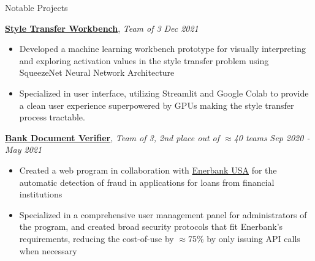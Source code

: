 \documentclass{resume}
\begin{document}
%
%
%
%
%
%
\begin{rSection}{Notable Projects}

    \href{https://github.com/jlucasa/style-transfer-vis}{{\bf Style Transfer Workbench}}, {\em Team of 3} {\em \hfill Dec 2021}
    \vspace{-6pt}
    \begin{itemize}[nosep]
        \item Developed a machine learning workbench prototype for visually interpreting and exploring activation values in the style transfer problem using SqueezeNet Neural Network Architecture
        \item Specialized in user interface, utilizing Streamlit and Google Colab to provide a clean user experience superpowered by GPUs making the style transfer process tractable.
    \end{itemize}

    
    {\bf \href{https://bdv-2021.web.app}{Bank Document Verifier}}, {\em Team of 3, 2nd place out of $\approx$40 teams} {\em \hfill Sep 2020 - May 2021}
    \vspace{-6pt}
    \begin{itemize}[nosep]
        \item Created a web program in collaboration with \href{https://enerbank.com/}{Enerbank USA} for the automatic detection of fraud in applications for loans from financial institutions
        \item Specialized in a comprehensive user management panel for administrators of the program, and created broad security protocols that fit Enerbank's requirements, reducing the cost-of-use by $\approx$75\% by only issuing API calls when necessary
    \end{itemize}
    

\end{rSection}
\end{document}
